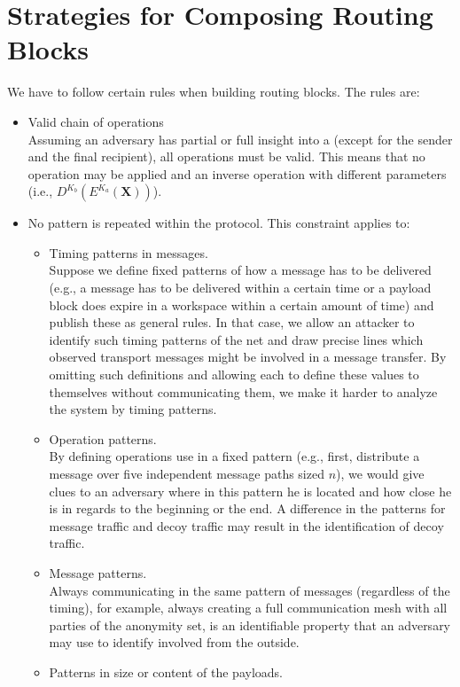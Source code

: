 \section{Strategies for Composing Routing Blocks}\label{sec:routingStrategies}
We have to follow certain rules when building routing blocks. The rules are:
\begin{itemize}
	\item Valid chain of operations\\
	Assuming an adversary has partial or full insight into a  (except for the sender and the final recipient), all operations must be valid. This means that no operation may be applied and an inverse operation with different parameters  (i.e., $D^{K_b}\left(E^{K_a}\left(\textbf{X}\right)\right)$).
	\item No pattern is repeated within the protocol. This constraint applies to:
	\begin{itemize}
		\item Timing patterns in messages.\\
		Suppose we define fixed patterns of how a message has to be delivered (e.g., a message has to be delivered within a certain time or a payload block does expire in a workspace within a certain amount of time) and publish these as general rules. In that case, we allow an attacker to identify such timing patterns of the net and draw precise lines which observed transport messages might be involved in a message transfer. By omitting such definitions and allowing each  to define these values to themselves without communicating them, we make it harder to analyze the system by timing patterns.
		\item Operation patterns.\\
		By defining operations use in a fixed pattern (e.g., first, distribute a message over five independent message paths sized $n$), we would give clues to an adversary where in this pattern he is located and how close he is in regards to the beginning or the end. A difference in the patterns for message traffic and decoy traffic may result in the identification of decoy traffic.
		\item Message patterns.\\
		Always communicating in the same pattern of messages (regardless of the timing), for example, always creating a full communication mesh with all parties of the anonymity set, is an identifiable property that an adversary may use to identify involved \VortexNodes{} from the outside.
		\item Patterns in size or content of the payloads.\\

\end{itemize}
\end{itemize}
